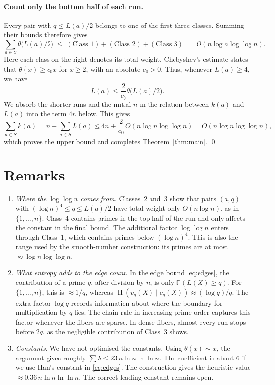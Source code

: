 \documentclass[11pt]{article}
\theoremstyle{remark}
\newcommand{\Pp}{\mathbb{P}}
\DeclareMathOperator{\HH}{H}
\begin{document}
\paragraph{Count only the bottom half of each run.}
Every pair with $q\le L(a)/2$ belongs to one of the first three classes.
Summing their bounds therefore gives
\[
  \sum_{a\in S}\theta\bigl(L(a)/2\bigr)\;\le\;(\text{Class }1)+(\text{Class }2)+(\text{Class }3)\;=\;O(n\log n\log\log n).
\]
Here each class on the right denotes its total weight.
Chebyshev's estimate states that $\theta(x)\ge c_0x$ for $x\ge2$, with an absolute $c_0>0$.
Thus, whenever $L(a)\ge4$, we have
\[
  L(a)\le\frac{2}{c_0}\theta\bigl(L(a)/2\bigr).
\]
We absorb the shorter runs and the initial $n$ in the relation between $k(a)$ and $L(a)$ into the term $4n$ below.
This gives
\[
  \sum_{a\in S}k(a)=n+\sum_{a\in S}L(a)\le 4n+\frac{2}{c_0}\,O(n\log n\log\log n)=O(n\log n\log\log n),
\]
which proves the upper bound and completes Theorem~\ref{thm:main}.
\qed

\section{Remarks}

\begin{enumerate}[leftmargin=*,itemsep=4pt]
\item \emph{Where the $\log\log n$ comes from.}
Classes~2 and~3 show that pairs $(a,q)$ with $(\log n)^4\le q\le L(a)/2$ have total weight only $O(n\log n)$, as in $\{1,\dots,n\}$.
Class~4 contains primes in the top half of the run and only affects the constant in the final bound.
The additional factor $\log\log n$ enters through Class~1, which contains primes below $(\log n)^4$.
This is also the range used by the smooth-number construction: its primes are at most $\approx\log n\log\log n$.

\item \emph{What entropy adds to the edge count.}
In the edge bound \eqref{eq:edges}, the contribution of a prime $q$, after division by $n$, is only $\Pp(L(X)\ge q)$.
For $\{1,\dots,n\}$, this is $\approx 1/q$, whereas $\HH(v_q(X)\mid c_q(X))\approx(\log q)/q$.
The extra factor $\log q$ records information about where the boundary for multiplication by $q$ lies.
The chain rule in increasing prime order captures this factor whenever the fibers are sparse.
In dense fibers, almost every run stops before $2q$, as the negligible contribution of Class~3 shows.

\item \emph{Constants.}
We have not optimised the constants.
Using $\theta(x)\sim x$, the argument gives roughly $\sum k\le 23\,n\ln n\ln\ln n$.
The coefficient is about $6$ if we use Han's constant in \eqref{eq:edges}.
The construction gives the heuristic value $\approx0.36\,n\ln n\ln\ln n$.
The correct leading constant remains open.
\end{enumerate}
\end{document}
